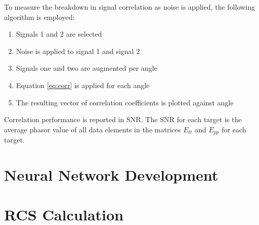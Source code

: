     To measure the breakdown in signal correlation as noise is applied, the following algorithm is employed:

    \begin{enumerate}
      \item Signals 1 and 2 are selected
      \item Noise is applied to signal 1 and signal 2
      \item Signals one and two are augmented per angle
      \item Equation \ref{eq:corr} is applied for each angle
      \item The resulting vector of correlation coefficients is plotted against angle
    \end{enumerate}

    Correlation performance is reported in SNR. The SNR for each target is the average phasor value of all data elements in the matrices $E_{tt}$ and $E_{pp}$ for each target.


\section{Neural Network Development}




\section{RCS Calculation}
